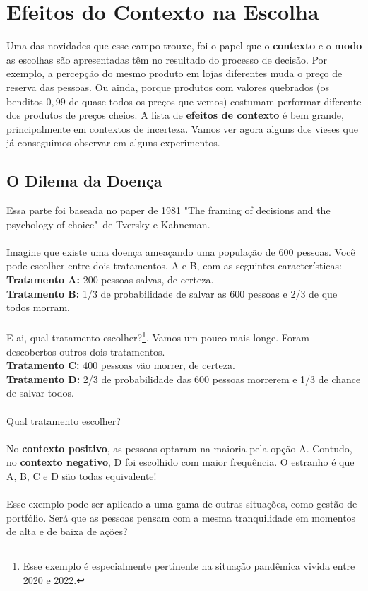 \documentclass[a4paper,11pt,oneside]{book}
\theoremstyle{definition}
\theoremstyle{break}
\begin{document}
\section{Efeitos do Contexto na Escolha}

Uma das novidades que esse campo trouxe, foi o papel que o \textbf{contexto} e o \textbf{modo} as escolhas são apresentadas têm no resultado do processo de decisão. Por exemplo, a percepção do mesmo produto em lojas diferentes muda o preço de reserva das pessoas. Ou ainda, porque produtos com valores quebrados (os benditos $0,99$ de quase todos os preços que vemos) costumam performar diferente dos produtos de preços cheios. A lista de \textbf{efeitos de contexto} é bem grande, principalmente em contextos de incerteza. Vamos ver agora alguns dos vieses que já conseguimos observar em alguns experimentos. 

\subsection{O Dilema da Doença}

Essa parte foi baseada no paper de 1981 "The framing of decisions and the psychology of choice"\ de Tversky e Kahneman.
\\~\\
Imagine que existe uma doença ameaçando uma população de 600 pessoas. Você pode escolher entre dois tratamentos, A e B, com as seguintes características:
\\
\textbf{Tratamento A:} 200 pessoas salvas, de certeza.\\
\textbf{Tratamento B:} 1/3 de probabilidade de salvar as 600 pessoas e 2/3 de que todos morram.
\\~\\
E ai, qual tratamento escolher?\footnote{Esse exemplo é especialmente pertinente na situação pandêmica vivida entre 2020 e 2022.}. Vamos um pouco mais longe. Foram descobertos outros dois tratamentos.
\\
\textbf{Tratamento C:} 400 pessoas vão morrer, de certeza.\\
\textbf{Tratamento D:} 2/3 de probabilidade das 600 pessoas morrerem e 1/3 de chance de salvar todos.
\\~\\
Qual tratamento escolher?
\\~\\
No \textbf{contexto positivo}, as pessoas optaram na maioria pela opção A. Contudo, no \textbf{contexto negativo}, D foi escolhido com maior frequência. O estranho é que A, B, C e D são todas equivalente!
\\~\\
Esse exemplo pode ser aplicado a uma gama de outras situações, como gestão de portfólio. Será que as pessoas pensam com a mesma tranquilidade em momentos de alta e de baixa de ações?
\end{document}
